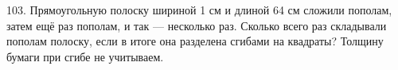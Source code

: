 103. Прямоугольную полоску шириной 1 см и длиной 64 см сложили пополам, затем ещё раз пополам, и так --- несколько раз. Сколько всего раз складывали пополам полоску, если в итоге она разделена сгибами на квадраты? Толщину бумаги при сгибе не учитываем.\\

